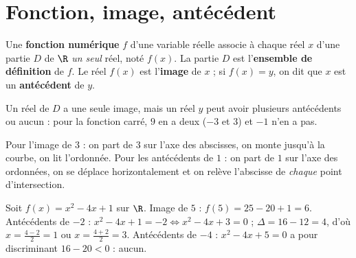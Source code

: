\section{Fonction, image, antécédent}
\begin{definition}
Une \textbf{fonction numérique} $f$ d'une variable réelle associe à chaque réel $x$ d'une partie $D$ de $\R$ \emph{un seul} réel, noté $f(x)$. La partie $D$ est l'\textbf{ensemble de définition} de $f$. Le réel $f(x)$ est l'\textbf{image} de $x$ ; si $f(x)=y$, on dit que $x$ est un \textbf{antécédent} de $y$.
\end{definition}
Un réel de $D$ a une seule image, mais un réel $y$ peut avoir plusieurs antécédents ou aucun : pour la fonction carré, $9$ en a deux ($-3$ et $3$) et $-1$ n'en a pas.
\begin{figurebox}[Lecture d'une image et d'antécédents sur la courbe de $f(x)=\frac{x^2}{3}-2$.]
\end{figurebox}
Pour l'image de $3$ : on part de $3$ sur l'axe des abscisses, on monte jusqu'à la courbe, on lit l'ordonnée. Pour les antécédents de $1$ : on part de $1$ sur l'axe des ordonnées, on se déplace horizontalement et on relève l'abscisse de \emph{chaque} point d'intersection.
\begin{example}
Soit $f(x)=x^2-4x+1$ sur $\R$. Image de $5$ : $f(5)=25-20+1=6$. Antécédents de $-2$ : $x^2-4x+1=-2\iff x^2-4x+3=0$ ; $\Delta=16-12=4$, d'où $x=\frac{4-2}{2}=1$ ou $x=\frac{4+2}{2}=3$. Antécédents de $-4$ : $x^2-4x+5=0$ a pour discriminant $16-20<0$ : aucun.
\end{example}

